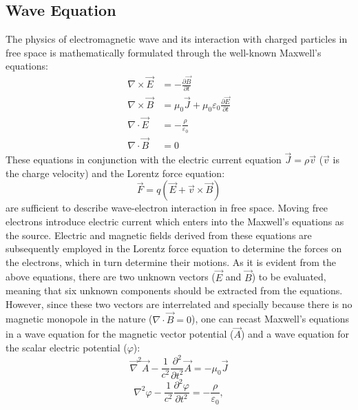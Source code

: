 \subsection{Wave Equation}
The physics of electromagnetic wave and its interaction with charged particles in free space is mathematically formulated through the well-known Maxwell's equations:
%
\begin{align}
\nabla \times \vec{E} &= -\frac{\displaystyle \partial \vec{B}}{\displaystyle \partial t} \\
\nabla \times \vec{B} &= \mu_0 \vec{J} + \mu_0 \varepsilon_{0} \frac{\displaystyle \partial \vec{E}}{\displaystyle \partial t} \\
\nabla \cdot \vec{E} &= -\frac{\displaystyle \rho}{\displaystyle \varepsilon_{0}} \\
\nabla \cdot \vec{B} &= 0
\end{align}
%
These equations in conjunction with the electric current equation $\vec{J}=\rho \vec{v}$ ($\vec{v}$ is the charge velocity) and the Lorentz force equation:
%
\begin{equation}
\label{LorentzForce}
\vec{F} = q(\vec{E} + \vec{v} \times \vec{B})
\end{equation}
%
are sufficient to describe wave-electron interaction in free space.
%
Moving free electrons introduce electric current which enters into the Maxwell's equations as the source.
%
Electric and magnetic fields derived from these equations are subsequently employed in the Lorentz force equation to determine the forces on the electrons, which in turn determine their motions.
%
As it is evident from the above equations, there are two unknown vectors ($\vec{E}$ and $\vec{B}$) to be evaluated, meaning that six unknown components should be extracted from the equations.
%
However, since these two vectors are interrelated and specially because there is no magnetic monopole in the nature ($\nabla \cdot \vec{B}=0 $), one can recast Maxwell's equations in a wave equation for the magnetic vector potential ($\vec{A}$) and a wave equation for the scalar electric potential ($\varphi$):
%
\begin{equation}
\label{WaveA}
{\vec{\nabla}}^{2}\vec{A} - \frac{1}{c^2} \frac{\displaystyle \partial^2}{\displaystyle \partial t^2}\vec{A} = -\mu_{0} \vec{J}
\end{equation}
%
\begin{equation}
\label{WaveF}
{\nabla}^{2}\varphi- \frac{1}{c^2} \frac{\displaystyle \partial^2 \varphi}{\displaystyle \partial t^2} = -\frac{\displaystyle \rho}{\displaystyle \varepsilon_{0}},
\end{equation}
